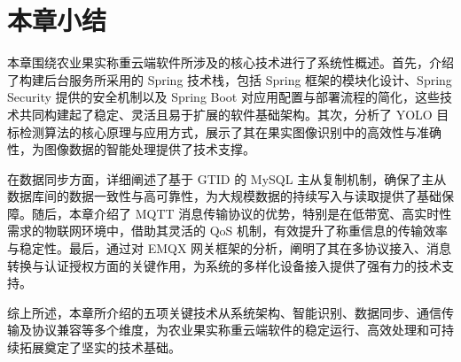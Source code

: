 \section{本章小结}

本章围绕农业果实称重云端软件所涉及的核心技术进行了系统性概述。首先，介绍了构建后台服务所采用的 Spring 技术栈，包括 Spring 框架的模块化设计、Spring Security 提供的安全机制以及 Spring Boot 对应用配置与部署流程的简化，这些技术共同构建起了稳定、灵活且易于扩展的软件基础架构。其次，分析了 YOLO 目标检测算法的核心原理与应用方式，展示了其在果实图像识别中的高效性与准确性，为图像数据的智能处理提供了技术支撑。

在数据同步方面，详细阐述了基于 GTID 的 MySQL 主从复制机制，确保了主从数据库间的数据一致性与高可靠性，为大规模数据的持续写入与读取提供了基础保障。随后，本章介绍了 MQTT 消息传输协议的优势，特别是在低带宽、高实时性需求的物联网环境中，借助其灵活的 QoS 机制，有效提升了称重信息的传输效率与稳定性。最后，通过对 EMQX 网关框架的分析，阐明了其在多协议接入、消息转换与认证授权方面的关键作用，为系统的多样化设备接入提供了强有力的技术支持。

综上所述，本章所介绍的五项关键技术从系统架构、智能识别、数据同步、通信传输及协议兼容等多个维度，为农业果实称重云端软件的稳定运行、高效处理和可持续拓展奠定了坚实的技术基础。